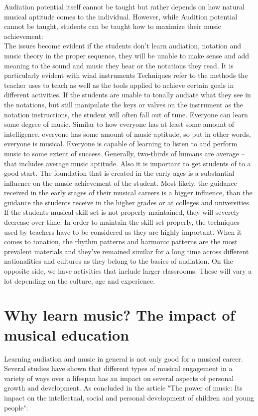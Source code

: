Audiation potential itself cannot be taught but rather depends on how natural musical aptitude comes to the individual. However, while Audition potential cannot be taught, students can be taught how to maximize their music achievement\cite{audiation}:\\

The issues become evident if the students don’t learn audiation, notation and music theory in the proper sequence, they will be unable to make sense and add meaning to the sound and music they hear or the notations they read. It is particularly evident with wind instruments Techniques refer to the methods the teacher uses to teach as well as the tools applied to achieve certain goals in different activities.\cite{audiation} If the students are unable to tonally audiate what they see in the notations, but still manipulate the keys or valves on the instrument as the notation instructions, the student will often fall out of tune.
Everyone can learn some degree of music. Similar to how everyone has at least some amount of intelligence, everyone has some amount of music aptitude, so put in other words, everyone is musical. Everyone is capable of learning to listen to and perform music to some extent of success.\cite{audiation} Generally, two-thirds of humans are average – that includes average music aptitude.
Also it is important to get students of to a good start. The foundation that is created in the early ages is a substantial influence on the music achievement of the student. Most likely, the guidance received in the early stages of their musical careers is a bigger influence, than the guidance the students receive in the higher grades or at colleges and universities. If the students musical skill-set is not properly maintained, they will severely decrease over time.
In order to maintain the skill-set properly, the techniques used by teachers have to be considered as
they are highly important. \cite{audiation}When it comes to tonation, the rhythm patterns and harmonic patterns are the most prevalent materials and they’ve remained similar for a long time across different nationalities and cultures as they belong to the basics of audiation. On the opposite side, we have activities that include larger classrooms. These will vary a lot depending on the culture, age and experience.\cite{audiation}\\


\section{Why learn music? The impact of musical education}
Learning audiation and music in general is not only good for a musical career. Several studies have shown that different types of musical engagement in a variety of ways over a lifespan has an impact on several aspects of personal growth and development. As concluded in the article "The power of music: Its impact on the intellectual, social and personal development of children and young people":\\

